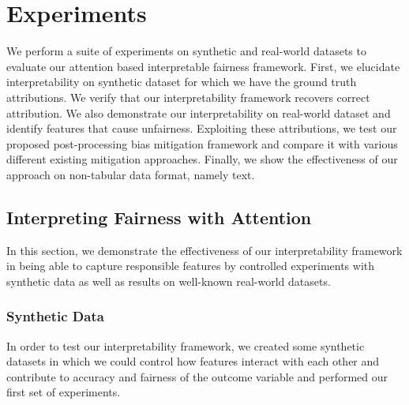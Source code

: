 \section{Experiments}
We perform a suite of experiments on synthetic and real-world datasets to evaluate our attention based interpretable fairness framework. First, we elucidate %
interpretability on synthetic dataset for which we have the ground truth attributions. We verify that our interpretability framework recovers correct attribution. We also demonstrate our interpretability on real-world dataset and identify features that cause unfairness.  Exploiting these attributions, we test our proposed post-processing bias mitigation framework and compare it with various different existing mitigation approaches. Finally, we show the effectiveness of our approach on non-tabular data format, namely text.


\subsection{Interpreting Fairness with Attention}

In this section, we demonstrate the effectiveness of our interpretability framework in being able to capture responsible features by controlled experiments with synthetic data as well as results on well-known real-world datasets.

\subsubsection{Synthetic Data}
In order to test our interpretability framework, we created some synthetic datasets in which we could control how features interact with each other and contribute to accuracy and fairness of the outcome variable and performed our first set of experiments.

